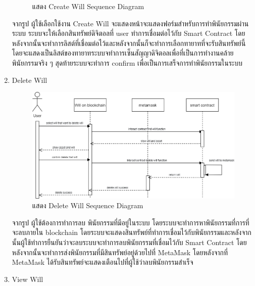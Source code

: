 \documentclass[12pt,oneside,openright,a4paper]{cpe-thai-project}
\begin{document}
\begin{enumerate}[label=\thesubsection.\arabic*,leftmargin=0pt,itemindent=2.5cm]
\begin{figure}[!thb]
			\caption{แสดง Create Will Sequence Diagram}
		\end{figure}
		\FloatBarrier
	\tab จากรูป ผู้ใช้เลือกใช้งาน Create Will จะแสดงหน้าจะแสดงฟอร์มสำหรับการทำพินัยกรรมผ่านระบบ ระบบจะให้เลือกสินทรัพย์ดิจิตอลที่ user ทำการเชื่อมต่อไว้กับ Smart Contract โดยหลังจากนั้นจะทำการลิสต์ที่เชื่อมต่อไว้และหลังจากนั้นก็จะทำการเลือกทายาทที่จะรับสินทรัพย์นี้ โดยจะแสดงเป็นลิสต์ของทายาทระบบจทำการเซ็นสัญญาดิจิตอลเพื่อที่เป็นการทำงานคล้ายพินัยกรรมจริง ๆ สุดท้ายระบบจะทำการ confirm เพื่อเป็นการเสร็จการทำพินัยกรรมในระบบ
	\item Delete Will
	\begin{table}
\centering
\caption{ตารางแสดงรายละเอียดของ Use Case Connect meta mask Wallet}
\end{table}
		\begin{figure}[!thb]
			\centering
			\includegraphics[scale=0.2]{deleteWillseq}
			\caption{แสดง Delete Will Sequence Diagram}
		\end{figure}
		\FloatBarrier
	\tab จากรูป ผู้ใช้ต้องการทำการลบ พินัยกรรมที่มีอยู่ในระบบ โดยระบบจะทำการหาพินัยกรรมที่การที่จะลบภายใน blockchain โดยระบบจะแสดงสินทรัพย์ที่ทำการเชื่อมไว้กับพินัยกรรมและหลังจากนั้นผู้ใช้ทำการยืนยันว่าจะลบระบบจะทำการลบพินัยกรรมที่เชื่อมไว้กับ Smart Contract โดยหลังจากนั้นจะทำการส่งพินัยกรรมที่มีสินทรัพย์อยู่ด้วยไปที่ MetaMask โดยหลังจากที่ MetaMask ได้รับสินทรัพย์จะแสดงเตือนไปที่ผู้ใช้ว่าลบพินัยกรรมสำเร็จ
	\item View Will

\end{enumerate}
\end{document}
